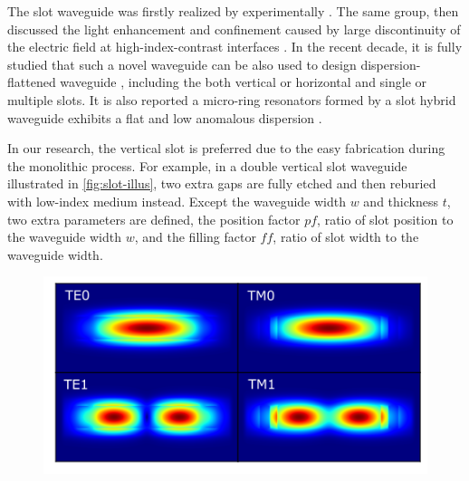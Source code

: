 The slot waveguide was firstly realized by \citeauthor{Xu2004} experimentally \cite{Xu2004}. The same group, \citeauthor{Almeida2004} then discussed the light enhancement and confinement caused by large discontinuity of the electric field at high-index-contrast interfaces \cite{Almeida2004}. In the recent decade, it is fully studied that such a novel waveguide can be also used to design dispersion-flattened waveguide \cites{Mas2010, Zhang2010, Zhu2012, Nolte2013}, including the both vertical or horizontal and single or multiple slots. It is also reported a micro-ring resonators formed by a slot hybrid waveguide 
exhibits a flat and low anomalous dispersion \cite{Zhang2013}.

In our research, the vertical slot is preferred due to the easy fabrication during the monolithic process. 
For example, in a double vertical slot waveguide illustrated in \autoref{fig:slot-illus}, two extra gaps are fully etched and then reburied with low-index medium instead. 
Except the waveguide width $w$ and thickness $t$, two extra parameters are defined, the position factor $ \mathit{pf} $, ratio of slot position to the waveguide width $w$, and the filling factor $ \mathit{ff} $, ratio of slot width to the waveguide width.

\begin{figure}
		\centering	
		
		\label{fig:slot-illus}
\end{figure}


\begin{figure}
	\centering
	\includegraphics[width=.8\linewidth]{imgs/png/slot_mode}
 	\label{fig:slot-mode}
\end{figure}

